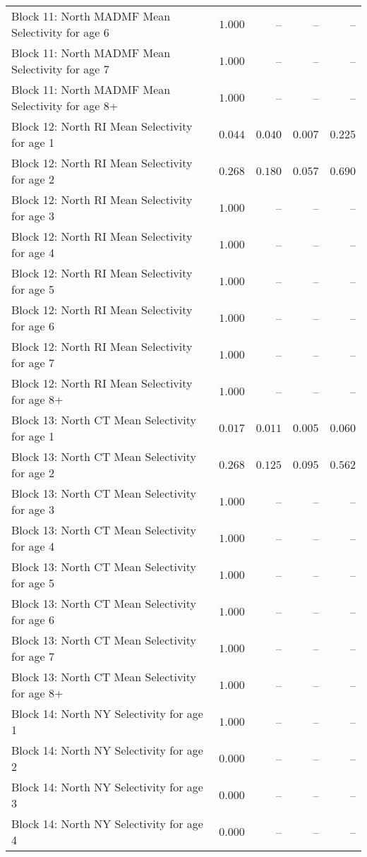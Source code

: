 \documentclass[
]{article}
\begin{document}
\begin{landscape}
\begin{longtable}[t]{lrrrr}
Block 11: North MADMF Mean Selectivity for age 6 & $1.000$ & -- & -- & --\\
Block 11: North MADMF Mean Selectivity for age 7 & $1.000$ & -- & -- & --\\
Block 11: North MADMF Mean Selectivity for age 8+ & $1.000$ & -- & -- & --\\
\addlinespace
Block 12: North RI Mean Selectivity for age 1 & $0.044$ & $0.040$ & $0.007$ & $0.225$\\
Block 12: North RI Mean Selectivity for age 2 & $0.268$ & $0.180$ & $0.057$ & $0.690$\\
Block 12: North RI Mean Selectivity for age 3 & $1.000$ & -- & -- & --\\
Block 12: North RI Mean Selectivity for age 4 & $1.000$ & -- & -- & --\\
Block 12: North RI Mean Selectivity for age 5 & $1.000$ & -- & -- & --\\
\addlinespace
Block 12: North RI Mean Selectivity for age 6 & $1.000$ & -- & -- & --\\
Block 12: North RI Mean Selectivity for age 7 & $1.000$ & -- & -- & --\\
Block 12: North RI Mean Selectivity for age 8+ & $1.000$ & -- & -- & --\\
Block 13: North CT Mean Selectivity for age 1 & $0.017$ & $0.011$ & $0.005$ & $0.060$\\
Block 13: North CT Mean Selectivity for age 2 & $0.268$ & $0.125$ & $0.095$ & $0.562$\\
\addlinespace
Block 13: North CT Mean Selectivity for age 3 & $1.000$ & -- & -- & --\\
Block 13: North CT Mean Selectivity for age 4 & $1.000$ & -- & -- & --\\
Block 13: North CT Mean Selectivity for age 5 & $1.000$ & -- & -- & --\\
Block 13: North CT Mean Selectivity for age 6 & $1.000$ & -- & -- & --\\
Block 13: North CT Mean Selectivity for age 7 & $1.000$ & -- & -- & --\\
\addlinespace
Block 13: North CT Mean Selectivity for age 8+ & $1.000$ & -- & -- & --\\
Block 14: North NY Selectivity for age 1 & $1.000$ & -- & -- & --\\
Block 14: North NY Selectivity for age 2 & $0.000$ & -- & -- & --\\
Block 14: North NY Selectivity for age 3 & $0.000$ & -- & -- & --\\
Block 14: North NY Selectivity for age 4 & $0.000$ & -- & -- & --\\

\end{longtable}
\end{landscape}
\end{document}
